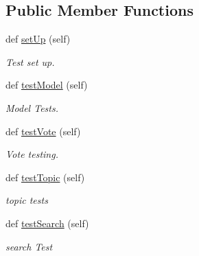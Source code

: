 \subsection*{Public Member Functions}
\begin{DoxyCompactItemize}
\item 
\hypertarget{class_meanco_app_1_1tests_1_1_model_test_cases_a2cb9707cd0c7c3c614e3256c184c6d32}{}\label{class_meanco_app_1_1tests_1_1_model_test_cases_a2cb9707cd0c7c3c614e3256c184c6d32} 
def \hyperlink{class_meanco_app_1_1tests_1_1_model_test_cases_a2cb9707cd0c7c3c614e3256c184c6d32}{set\+Up} (self)
\begin{DoxyCompactList}\small\item\em Test set up. \end{DoxyCompactList}\item 
\hypertarget{class_meanco_app_1_1tests_1_1_model_test_cases_aec43d52cace78ddccf2f26c3e880853e}{}\label{class_meanco_app_1_1tests_1_1_model_test_cases_aec43d52cace78ddccf2f26c3e880853e} 
def \hyperlink{class_meanco_app_1_1tests_1_1_model_test_cases_aec43d52cace78ddccf2f26c3e880853e}{test\+Model} (self)
\begin{DoxyCompactList}\small\item\em Model Tests. \end{DoxyCompactList}\item 
\hypertarget{class_meanco_app_1_1tests_1_1_model_test_cases_a505af0736fff4cc78c6b01434574a327}{}\label{class_meanco_app_1_1tests_1_1_model_test_cases_a505af0736fff4cc78c6b01434574a327} 
def \hyperlink{class_meanco_app_1_1tests_1_1_model_test_cases_a505af0736fff4cc78c6b01434574a327}{test\+Vote} (self)
\begin{DoxyCompactList}\small\item\em Vote testing. \end{DoxyCompactList}\item 
\hypertarget{class_meanco_app_1_1tests_1_1_model_test_cases_a072a3581e9041e645f1ed0a04c18ad0b}{}\label{class_meanco_app_1_1tests_1_1_model_test_cases_a072a3581e9041e645f1ed0a04c18ad0b} 
def \hyperlink{class_meanco_app_1_1tests_1_1_model_test_cases_a072a3581e9041e645f1ed0a04c18ad0b}{test\+Topic} (self)
\begin{DoxyCompactList}\small\item\em topic tests \end{DoxyCompactList}\item 
\hypertarget{class_meanco_app_1_1tests_1_1_model_test_cases_a2f166524c7da16b92e20ba70a49a2168}{}\label{class_meanco_app_1_1tests_1_1_model_test_cases_a2f166524c7da16b92e20ba70a49a2168} 
def \hyperlink{class_meanco_app_1_1tests_1_1_model_test_cases_a2f166524c7da16b92e20ba70a49a2168}{test\+Search} (self)
\begin{DoxyCompactList}\small\item\em search Test \end{DoxyCompactList}\end{DoxyCompactItemize}
